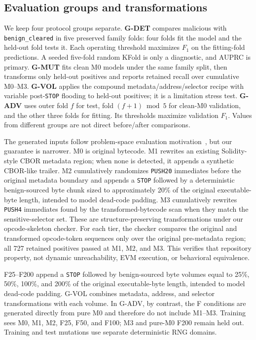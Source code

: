 \subsection{Evaluation groups and transformations}

We keep four protocol groups separate. \textbf{G-DET} compares malicious with \texttt{benign\_cleared} in five preserved family folds: four folds fit the model and the held-out fold tests it. Each operating threshold maximizes $F_1$ on the fitting-fold predictions. A seeded five-fold random KFold is only a diagnostic, and AUPRC is primary. \textbf{G-MUT} fits clean M0 models under the same family split, then transforms only held-out positives and reports retained recall over cumulative M0--M3. \textbf{G-VOL} applies the compound metadata/address/selector recipe with variable post-\texttt{STOP} flooding to held-out positives; it is a limitation stress test. \textbf{G-ADV} uses outer fold $f$ for test, fold $(f+1)\bmod 5$ for clean-M0 validation, and the other three folds for fitting. Its thresholds maximize validation $F_1$. Values from different groups are not direct before/after comparisons.

The generated inputs follow problem-space evaluation motivation~\cite{pierazzi2020problemspace}, but our guarantee is narrower. M0 is original bytecode. M1 rewrites an existing Solidity-style CBOR metadata region; when none is detected, it appends a synthetic CBOR-like trailer. M2 cumulatively randomizes \texttt{PUSH20} immediates before the original metadata boundary and appends a \texttt{STOP} followed by a deterministic benign-sourced byte chunk sized to approximately 20\% of the original executable-byte length, intended to model dead-code padding. M3 cumulatively rewrites \texttt{PUSH4} immediates found by the transformed-bytecode scan when they match the sensitive-selector set. These are structure-preserving transformations under our opcode-skeleton checker. For each tier, the checker compares the original and transformed opcode-token sequences only over the original pre-metadata region; all 727 retained positives passed at M1, M2, and M3. This verifies that repository property, not dynamic unreachability, EVM execution, or behavioral equivalence.

F25--F200 append a \texttt{STOP} followed by benign-sourced byte volumes equal to 25\%, 50\%, 100\%, and 200\% of the original executable-byte length, intended to model dead-code padding. G-VOL combines metadata, address, and selector transformations with each volume. In G-ADV, by contrast, the F conditions are generated directly from pure M0 and therefore do not include M1--M3. Training sees M0, M1, M2, F25, F50, and F100; M3 and pure-M0 F200 remain held out. Training and test mutations use separate deterministic RNG domains.

